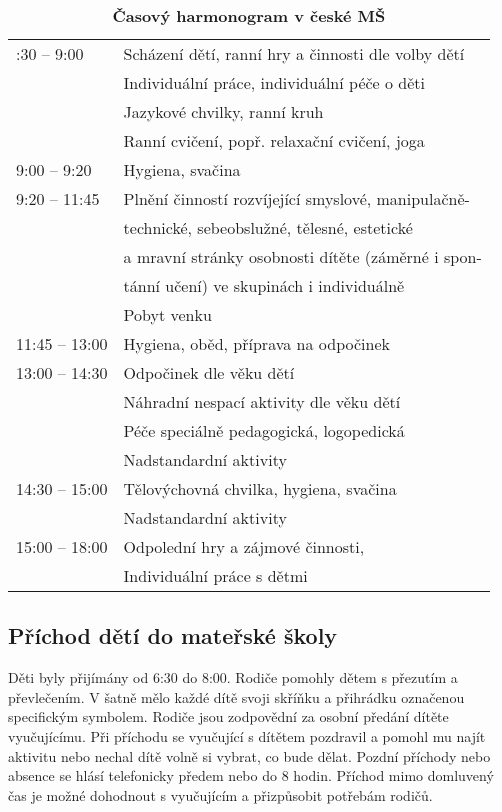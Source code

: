 		\begin{spacing}{1.0}
		\begin{table}[h!]
			\center
			\begin{tabular}{|l l|}
				\rowcolor{white}
				\hline
			6:30 – 9:00				& Scházení dětí, ranní hry a činnosti dle volby dětí 	\\ 
									& Individuální práce, individuální péče o děti\\
									& Jazykové chvilky, ranní kruh 	\\
									& Ranní cvičení, popř. relaxační cvičení, joga \\
			9:00 – 9:20				& Hygiena, svačina	\\
			9:20 – 11:45			& Plnění činností rozvíjející smyslové, manipulačně-	\\
									& technické, sebeobslužné, tělesné, estetické \\
									& a mravní stránky osobnosti dítěte (záměrné i spon- \\
									& tánní učení) ve skupinách i individuálně \\
									& Pobyt venku					\\
			11:45 – 13:00			& Hygiena, oběd, příprava na odpočinek					\\
			13:00 – 14:30			& Odpočinek dle věku dětí						\\
									& Náhradní nespací aktivity dle věku dětí 				\\
									& Péče speciálně pedagogická, logopedická				\\ 
									& Nadstandardní aktivity 							 \\
			14:30 – 15:00			& Tělovýchovná chvilka, hygiena, svačina 			\\
									& Nadstandardní aktivity 		\\
			15:00 – 18:00			& Odpolední hry a zájmové činnosti, \\
									& Individuální práce s dětmi\\
			\hline
			\end{tabular}
			\caption{ \textbf{Časový harmonogram v české MŠ}
			}
			\label{tab:rezimDneCR}
		\end{table}
		\end{spacing}

		\subsection{Příchod dětí do mateřské školy}
			
			Děti byly přijímány od 6:30 do 8:00. Rodiče pomohly dětem s přezutím a převlečením. V šatně mělo každé dítě svoji skříňku a přihrádku označenou specifickým symbolem. Rodiče jsou zodpovědní za osobní předání dítěte vyučujícímu. Při příchodu se vyučující s dítětem pozdravil a pomohl mu najít aktivitu nebo nechal dítě volně si vybrat, co bude dělat. Pozdní příchody nebo absence se hlásí telefonicky předem nebo do 8 hodin. Příchod mimo domluvený čas je možné dohodnout s vyučujícím a přizpůsobit potřebám rodičů.


